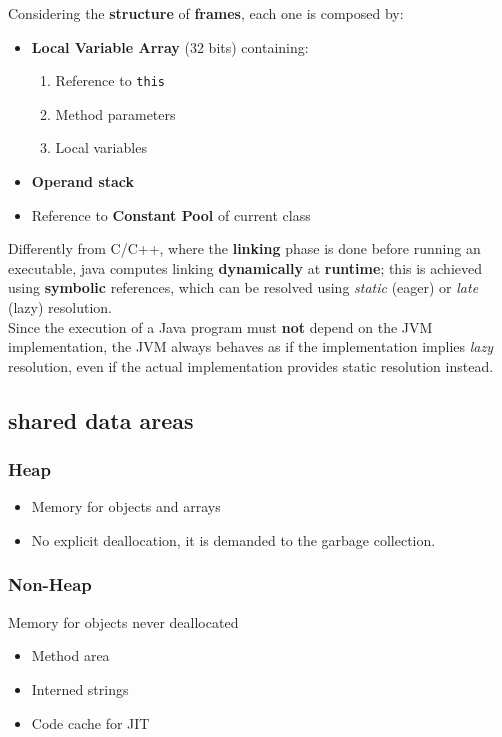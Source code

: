 Considering the \textbf{structure} of \textbf{frames}, each one is composed by:
\begin{itemize}
    \item \textbf{Local Variable Array} (32 bits) containing:
    \begin{enumerate}
        \item Reference to \lstinline{this}
        \item Method parameters
        \item Local variables
    \end{enumerate}
    \item \textbf{Operand stack}
    \item Reference to \textbf{Constant Pool} of current class
\end{itemize}

Differently from C/C++, where the \textbf{linking} phase is done before running an executable,
java computes linking \textbf{dynamically} at \textbf{runtime};
this is achieved using \textbf{symbolic} references, which can be resolved using \textit{static} (eager) or \textit{late} (lazy) resolution.\\
Since the execution of a Java program must \textbf{not} depend on the JVM implementation, the JVM always behaves as if the implementation implies \textit{lazy} resolution, 
even if the actual implementation provides static resolution instead.

\subsection{shared data areas}
\subsubsection{Heap}
\begin{itemize}
    \item Memory for objects and arrays
    \item No explicit deallocation, it is demanded to the garbage collection.
\end{itemize}

\subsubsection{Non-Heap}
Memory for objects never deallocated
\begin{itemize}
    \item Method area
    \item Interned strings
    \item Code cache for JIT
\end{itemize}

